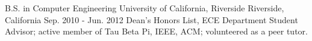 

\begin{cventries}

  \cventry
    {B.S. in Computer Engineering} %
    {University of California, Riverside} %
    {Riverside, California} %
    {Sep. 2010 - Jun. 2012} %
    {Dean's Honors List, ECE Department Student Advisor; active member of Tau Beta Pi, IEEE, ACM; volunteered as a peer tutor.} %
    {}
\end{cventries}
